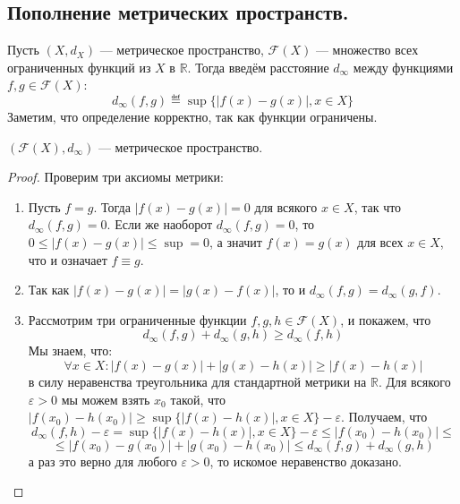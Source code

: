\documentclass[11pt]{article}
\begin{document}
    \subsection{Пополнение метрических пространств.}

    \begin{definition}
    Пусть $(X, d_X)$ --- метрическое пространство, $\mathcal{F}(X)$ --- множество всех ограниченных функций из $X$ в $\mathbb{R}$. Тогда введём расстояние $d_{\infty}$ между функциями $f, g \in \mathcal{F}(X)$:
    \begin{equation*}
        d_{\infty}(f, g) \eqdef \sup\{|f(x) - g(x)|, x \in X\}
    \end{equation*}
    Заметим, что определение корректно, так как функции ограничены.
    \end{definition}

    \begin{lemma}

    $(\mathcal{F}(X), d_{\infty})$ --- метрическое пространство.

    \end{lemma}

    \begin{proof}

     Проверим три аксиомы метрики:
    \begin{enumerate}
        \item Пусть $f = g$. Тогда $|f(x) - g(x)| = 0$ для всякого $x \in X$, так что $d_{\infty}(f, g) = 0$. Если же наоборот $d_{\infty}(f, g) = 0$, то $0 \leq |f(x) - g(x)| \leq \sup = 0$, а значит $f(x) = g(x)$ для всех $x \in X$, что и означает $f \equiv g$.
        \item Так как $|f(x) - g(x)| = |g(x) - f(x)|$, то и $d_{\infty}(f, g) = d_{\infty}(g, f)$.
        \item Рассмотрим три ограниченные функции $f, g, h \in \mathcal{F}(X)$, и покажем, что
        \begin{equation*}
            d_{\infty}(f, g) + d_{\infty}(g, h) \geq d_{\infty}(f, h)
        \end{equation*}
        Мы знаем, что:
        \begin{equation*}
            \forall x \in X: |f(x) - g(x)| + |g(x) - h(x)| \geq |f(x) - h(x)|
        \end{equation*}
        в силу неравенства треугольника для стандартной метрики на $\mathbb{R}$. Для всякого $\varepsilon > 0$ мы можем взять $x_0$ такой, что $|f(x_0) - h(x_0)| \geq \sup\{|f(x) - h(x)|, x \in X\} - \varepsilon$. Получаем, что
        \begin{equation*}
            d_{\infty}(f, h) - \varepsilon = \sup\{|f(x) - h(x)|, x \in X\} - \varepsilon \leq |f(x_0) - h(x_0)| \leq
        \end{equation*}
        \begin{equation*}
            \leq |f(x_0) - g(x_0)| + |g(x_0) - h(x_0)| \leq d_{\infty}(f, g) + d_{\infty}(g, h)
        \end{equation*}
        а раз это верно для любого $\varepsilon > 0$, то искомое неравенство доказано.
    \end{enumerate}
    \end{proof}
\end{document}
